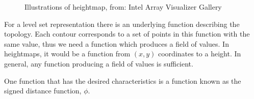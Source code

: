\begin{figure}[h]
\begin{center}
\end{center}
\caption{Illustrations of heightmap, from: Intel Array Visualizer Gallery}
\label{fig:heightmap}
\end{figure}



For a level set representation there is an underlying function
describing the topology. Each contour corresponds to a set of points
in this function with the same value, thus we need a function which
produces a field of values. In heightmaps, it would be a function from
$(x,y)$ coordinates to a height. In general, any function producing a
field of values is sufficient.  

One function that has the desired characteristics is a function known
as the signed distance function, $\phi$.

